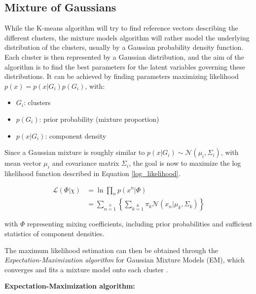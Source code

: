 \subsection{Mixture of Gaussians}

\vspace{\baselineskip}
\noindent While the K-means algorithm will try to find reference vectors describing the different clusters, the mixture models algorithm will rather model the underlying distribution of the clusters, usually by a Gaussian probability density function. Each cluster is then represented by a Gaussian distribution, and the aim of the algorithm is to find the best parameters for the latent variables governing these distributions. It can be achieved by finding parameters maximizing likelihood $p(x)=p(x|G_i)p(G_i)$, with:

\begin{itemize}
\item $G_i$: clusters
\item $p(G_i)$: prior probability (mixture proportion)
\item $p(x|G_i)$: component density
\end{itemize}

\noindent Since a Gaussian mixture is roughly similar to $p(x|G_i) \sim \mathcal{N}(\mu_i, \Sigma_i)$, with mean vector $\mu_i$ and covariance matrix $\Sigma_i$, the goal is now to maximize the log likelihood function described in Equation \ref{log_likelihood}.

\begin{equation}
\begin{array}{ll}
\mathcal{L}(\Phi|\chi) & = \ln \prod\limits_n p(x^n | \Phi) \\
 & = \sum\limits_{n=1}\limits^{N} \left\{ \sum \limits_{k=1}\limits^{K} \pi_k \mathcal{N}(x_n|\mu_k, \Sigma_k)\right\}
\end{array}
\label{log_likelihood}
\end{equation}

\noindent with $\Phi$ representing mixing coefficients, including prior probabilities and sufficient statistics of component densities.
\newline

\noindent The maximum likelihood estimation can then be obtained through the \textit{Expectation-Maximization algorithm} for Gaussian Mixture Models (EM), which converges and fits a mixture model onto each cluster \cite{BIS06}.
\newline

\pagebreak
\noindent \textbf{Expectation-Maximization algorithm:}
\newline

